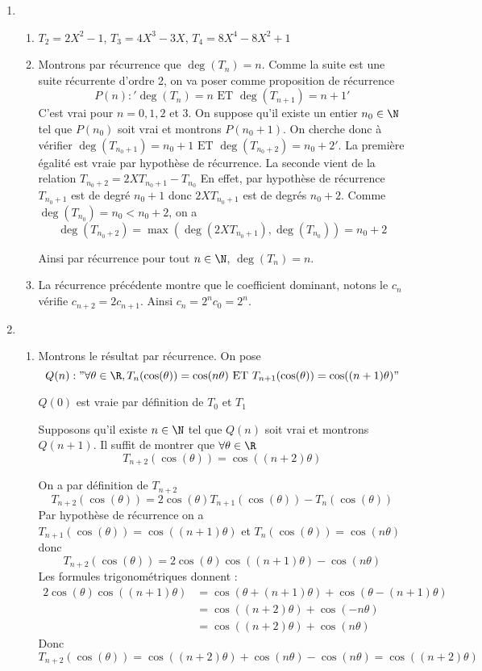 \begin{correction}
\begin{enumerate}
\item \begin{enumerate}
\item $T_2 = 2X^2-1$, $T_3 =4X^3-3X$, $T_4 = 8X^4 -8X^2+1 $
\item Montrons par récurrence que $\deg(T_n) =n$. 
Comme la suite est une suite récurrente d'ordre 2, on va poser comme proposition de récurrence $$P(n) : ' \deg(T_n) =n \text{ ET } \deg(T_{n+1}) =n+1'$$
C'est vrai pour $n=0,1,2$ et $3$.  On suppose qu'il existe un entier $n_0\in \N$ tel que $P(n_0)$ soit vrai et montrons $P(n_0+1)$. 
On cherche donc à vérifier $\deg(T_{n_0+1}) =n_0+1 \text{ ET } \deg(T_{n_0+2}) =n_0+2'$. La première égalité est vraie par hypothèse de récurrence. 
La seconde vient de la relation $T_{n_0+2} =2 X T_{n_0+1} -T_{n_0}$
En effet, par hypothèse de récurrence $T_{n_0+1}$ est de degré $n_0+1$ donc $2 X T_{n_0+1}$ est de degrés $n_0 +2$. Comme $\deg(T_{n_0}) =n_0<n_0+2$, on a 
$$\deg(T_{n_0+2} )=\max(\deg(2 X T_{n_0+1}),\deg(T_{n_0})) = n_0+2$$

Ainsi par récurrence pour tout $n\in \N$, $\deg(T_n)= n$.
\item La récurrence précédente montre que le coefficient dominant, notons le $c_n$ vérifie $c_{n+2} = 2 c_{n+1}$. Ainsi $c_n = 2^nc_0 =2^n$. 

\end{enumerate}
\item 
\begin{enumerate}
\item Montrons le résultat par récurrence. On pose 
$$Q(n) : " \forall \theta\in \R, T_n(\cos(\theta)) =\cos(n\theta)  \text{ ET } T_{n+1}(\cos(\theta)) =\cos((n+1)\theta)"$$

$Q(0)$ est vraie par définition de $T_0 $ et $T_1$ 

Supposons qu'il existe $n\in \N$ tel que $Q(n)$ soit vrai et montrons $Q(n+1)$. Il suffit de montrer que $\forall \theta \in \R$
$$T_{n+2}(\cos(\theta) )=\cos((n+2)\theta)$$

On a par définition de $T_{n+2}$ 
$$T_{n+2} (\cos(\theta))  = 2\cos(\theta) T_{n+1}(\cos(\theta)) -T_n(\cos(\theta))$$
Par hypothèse de récurrence on a 
$T_{n+1}(\cos(\theta)) =\cos((n+1)\theta)$ et 
$T_{n}(\cos(\theta))=\cos(n\theta) $ donc  
$$T_{n+2} (\cos(\theta)) =2 \cos(\theta) \cos((n+1) \theta) - \cos(n \theta)$$
Les formules trigonométriques donnent : 
\begin{align*}
2 \cos(\theta) \cos((n+1) \theta)   &=\cos(\theta+(n+1) \theta) +\cos(\theta-(n+1) \theta)\\
&=\cos((n+2) \theta) + \cos(-n\theta)\\
&=\cos((n+2) \theta) + \cos(n\theta)
\end{align*}
Donc 
$$T_{n+2} (\cos(\theta))  = \cos((n+2) \theta) + \cos(n\theta)-\cos(n\theta) = \cos((n+2)\theta)
$$



\end{enumerate}
\end{enumerate}
\end{correction}
